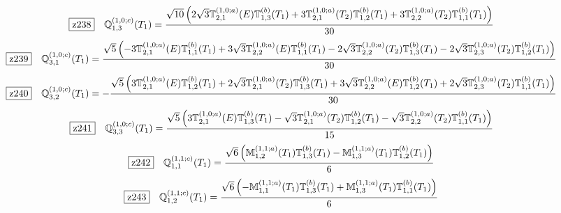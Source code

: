 \documentclass[fleqn,10pt,landscape]{jsarticle}
\begin{document}
\begin{dmath*}
\hspace*{3mm}\fbox{z238}\quad \mathbb{Q}_{1,3}^{(1,0;c)}(T_{1})=\frac{\sqrt{10} \left(2 \sqrt{3} \mathbb{T}_{2,1}^{(1,0;a)}(E) \mathbb{T}_{1,3}^{(b)}(T_{1}) + 3 \mathbb{T}_{2,1}^{(1,0;a)}(T_{2}) \mathbb{T}_{1,2}^{(b)}(T_{1}) + 3 \mathbb{T}_{2,2}^{(1,0;a)}(T_{2}) \mathbb{T}_{1,1}^{(b)}(T_{1})\right)}{30}
\end{dmath*}
\begin{dmath*}
\hspace*{3mm}\fbox{z239}\quad \mathbb{Q}_{3,1}^{(1,0;c)}(T_{1})=\frac{\sqrt{5} \left(- 3 \mathbb{T}_{2,1}^{(1,0;a)}(E) \mathbb{T}_{1,1}^{(b)}(T_{1}) + 3 \sqrt{3} \mathbb{T}_{2,2}^{(1,0;a)}(E) \mathbb{T}_{1,1}^{(b)}(T_{1}) - 2 \sqrt{3} \mathbb{T}_{2,2}^{(1,0;a)}(T_{2}) \mathbb{T}_{1,3}^{(b)}(T_{1}) - 2 \sqrt{3} \mathbb{T}_{2,3}^{(1,0;a)}(T_{2}) \mathbb{T}_{1,2}^{(b)}(T_{1})\right)}{30}
\end{dmath*}
\begin{dmath*}
\hspace*{3mm}\fbox{z240}\quad \mathbb{Q}_{3,2}^{(1,0;c)}(T_{1})=- \frac{\sqrt{5} \left(3 \mathbb{T}_{2,1}^{(1,0;a)}(E) \mathbb{T}_{1,2}^{(b)}(T_{1}) + 2 \sqrt{3} \mathbb{T}_{2,1}^{(1,0;a)}(T_{2}) \mathbb{T}_{1,3}^{(b)}(T_{1}) + 3 \sqrt{3} \mathbb{T}_{2,2}^{(1,0;a)}(E) \mathbb{T}_{1,2}^{(b)}(T_{1}) + 2 \sqrt{3} \mathbb{T}_{2,3}^{(1,0;a)}(T_{2}) \mathbb{T}_{1,1}^{(b)}(T_{1})\right)}{30}
\end{dmath*}
\begin{dmath*}
\hspace*{3mm}\fbox{z241}\quad \mathbb{Q}_{3,3}^{(1,0;c)}(T_{1})=\frac{\sqrt{5} \left(3 \mathbb{T}_{2,1}^{(1,0;a)}(E) \mathbb{T}_{1,3}^{(b)}(T_{1}) - \sqrt{3} \mathbb{T}_{2,1}^{(1,0;a)}(T_{2}) \mathbb{T}_{1,2}^{(b)}(T_{1}) - \sqrt{3} \mathbb{T}_{2,2}^{(1,0;a)}(T_{2}) \mathbb{T}_{1,1}^{(b)}(T_{1})\right)}{15}
\end{dmath*}
\begin{dmath*}
\hspace*{3mm}\fbox{z242}\quad \mathbb{Q}_{1,1}^{(1,1;c)}(T_{1})=\frac{\sqrt{6} \left(\mathbb{M}_{1,2}^{(1,1;a)}(T_{1}) \mathbb{T}_{1,3}^{(b)}(T_{1}) - \mathbb{M}_{1,3}^{(1,1;a)}(T_{1}) \mathbb{T}_{1,2}^{(b)}(T_{1})\right)}{6}
\end{dmath*}
\begin{dmath*}
\hspace*{3mm}\fbox{z243}\quad \mathbb{Q}_{1,2}^{(1,1;c)}(T_{1})=\frac{\sqrt{6} \left(- \mathbb{M}_{1,1}^{(1,1;a)}(T_{1}) \mathbb{T}_{1,3}^{(b)}(T_{1}) + \mathbb{M}_{1,3}^{(1,1;a)}(T_{1}) \mathbb{T}_{1,1}^{(b)}(T_{1})\right)}{6}
\end{dmath*}
\end{document}

